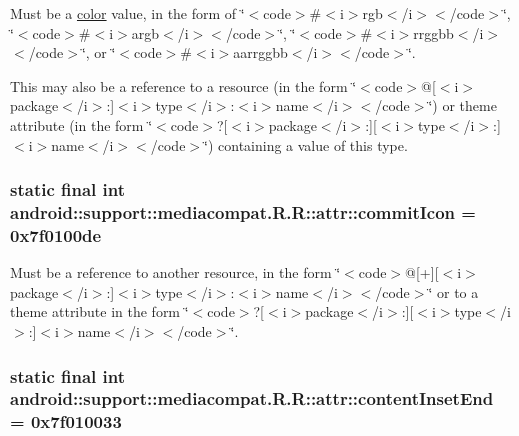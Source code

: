 Must be a \hyperlink{classandroid_1_1support_1_1mediacompat_1_1_r_1_1color}{color} value, in the form of \char`\"{}$<$code$>$\#$<$i$>$rgb$<$/i$>$$<$/code$>$\char`\"{}, \char`\"{}$<$code$>$\#$<$i$>$argb$<$/i$>$$<$/code$>$\char`\"{}, \char`\"{}$<$code$>$\#$<$i$>$rrggbb$<$/i$>$$<$/code$>$\char`\"{}, or \char`\"{}$<$code$>$\#$<$i$>$aarrggbb$<$/i$>$$<$/code$>$\char`\"{}. 

This may also be a reference to a resource (in the form \char`\"{}$<$code$>$@\mbox{[}$<$i$>$package$<$/i$>$:\mbox{]}$<$i$>$type$<$/i$>$:$<$i$>$name$<$/i$>$$<$/code$>$\char`\"{}) or theme attribute (in the form \char`\"{}$<$code$>$?\mbox{[}$<$i$>$package$<$/i$>$:\mbox{]}\mbox{[}$<$i$>$type$<$/i$>$:\mbox{]}$<$i$>$name$<$/i$>$$<$/code$>$\char`\"{}) containing a value of this type. \hypertarget{classandroid_1_1support_1_1mediacompat_1_1_r_1_1attr_d47113de0c74574ba2efb461013cd056}{
\subsubsection[{commitIcon}]{\setlength{\rightskip}{0pt plus 5cm}static final int android::support::mediacompat.R.R::attr::commitIcon = 0x7f0100de}}
\label{classandroid_1_1support_1_1mediacompat_1_1_r_1_1attr_d47113de0c74574ba2efb461013cd056}


Must be a reference to another resource, in the form \char`\"{}$<$code$>$@\mbox{[}+\mbox{]}\mbox{[}$<$i$>$package$<$/i$>$:\mbox{]}$<$i$>$type$<$/i$>$:$<$i$>$name$<$/i$>$$<$/code$>$\char`\"{} or to a theme attribute in the form \char`\"{}$<$code$>$?\mbox{[}$<$i$>$package$<$/i$>$:\mbox{]}\mbox{[}$<$i$>$type$<$/i$>$:\mbox{]}$<$i$>$name$<$/i$>$$<$/code$>$\char`\"{}. \hypertarget{classandroid_1_1support_1_1mediacompat_1_1_r_1_1attr_dcf9ead489d0e05d75c232c8caa74966}{
\subsubsection[{contentInsetEnd}]{\setlength{\rightskip}{0pt plus 5cm}static final int android::support::mediacompat.R.R::attr::contentInsetEnd = 0x7f010033}}
\label{classandroid_1_1support_1_1mediacompat_1_1_r_1_1attr_dcf9ead489d0e05d75c232c8caa74966}


